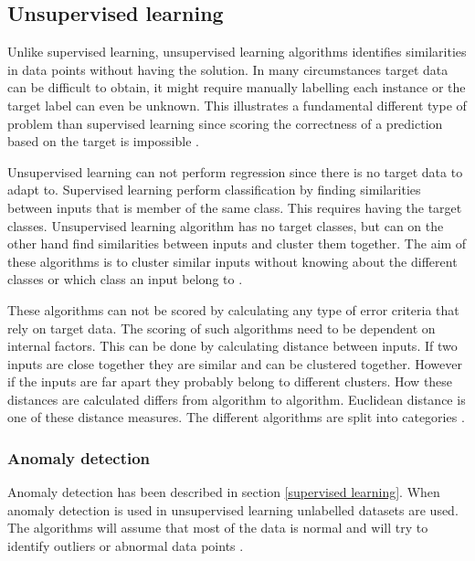 \documentclass[english, a4paper]{report}
\begin{document}
{{        \subsection{Unsupervised learning}\label{unsupervised learning}
        {
            Unlike supervised learning, unsupervised learning algorithms identifies similarities in data points without having the solution. In many circumstances target data can be difficult to obtain, it might require manually labelling each instance or the target label can even be unknown. This illustrates a fundamental different type of problem than supervised learning since scoring the correctness of a prediction based on the target is impossible \cite{mlMarsland}. 
            \par 
            Unsupervised learning can not perform regression since there is no target data to adapt to. Supervised learning perform classification by finding similarities between inputs that is member of the same class. This requires having the target classes. Unsupervised learning algorithm has no target classes, but can on the other hand find similarities between inputs and cluster them together. The aim of these algorithms is to cluster similar inputs without knowing about the different classes or which class an input belong to \cite{mlMarsland}. 
            \par
            These algorithms can not be scored by calculating any type of error criteria that rely on target data. The scoring of such algorithms need to be dependent on internal factors. This can be done by calculating distance between inputs. If two inputs are close together they are similar and can be clustered together. However if the inputs are far apart they probably belong to different clusters. How these distances are calculated differs from algorithm to algorithm. Euclidean distance is one of these distance measures. The different algorithms are split into categories \cite{mlMarsland}.
            
            \subsubsection{Anomaly detection}
            {
                Anomaly detection has been described in section \ref{supervised learning}. When anomaly detection is used in unsupervised learning unlabelled datasets are used. The algorithms will assume that most of the data is normal and will try to identify outliers or abnormal data points \cite{anomalyDetection}.
            }
            
}}}
\end{document}

